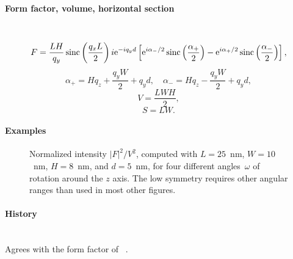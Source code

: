 \paragraph{Form factor, volume, horizontal section}\strut\\
\begin{equation*}
  F = \frac{L H}{q_y}
  \operatorname{sinc}\left(\frac{q_xL}{2}\right)
  i\mathrm e^{-i q_y d}
  \left[
    \mathrm e^{i \alpha_{-}/2} \operatorname{sinc}\left( \frac{\alpha_{+}}{2} \right)
    - \mathrm e^{i \alpha_{+}/2} \operatorname{sinc}\left( \frac{\alpha_{-}}{2} \right)
  \right],
\end{equation*}
\begin{equation*}
  \alpha_{+} = H q_z + \frac{q_y W}{2} + q_y d, \quad
  \alpha_{-} = H q_z - \frac{q_y W}{2} + q_y d,
\end{equation*}
\begin{equation*}
  V = \dfrac{L W H}{2},
\end{equation*}
\begin{equation*}
  S = L W.
\end{equation*}

\paragraph{Examples}\strut

\begin{figure}[H]
\begin{center}
\end{center}
\caption{Normalized intensity $|F|^2/V^2$,
computed with $L=25$~nm, $W=10$~nm, $H=8$~nm, and $d=5$~nm,
for four different angles~$\omega$ of rotation around the $z$ axis.
The low symmetry requires other angular ranges than used in most other figures.}
\end{figure}

\paragraph{History}\strut\\
Agrees with the  form factor of \FitGISAXS\ \cite{Bab13}.

